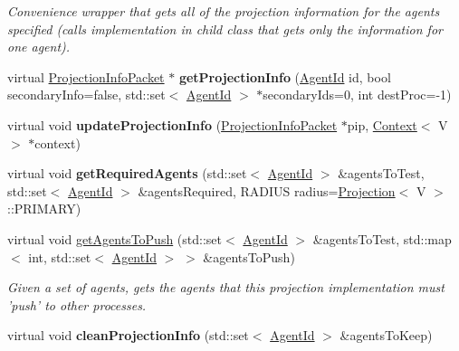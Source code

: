 \begin{DoxyCompactItemize}
\begin{DoxyCompactList}\small\item\em Convenience wrapper that gets all of the projection information for the agents specified (calls implementation in child class that gets only the information for one agent). \end{DoxyCompactList}\item 
\hypertarget{classrepast_1_1_graph_acd792216213093f9fea3b676d10ccdc7}{virtual \hyperlink{classrepast_1_1_projection_info_packet}{Projection\-Info\-Packet} $\ast$ {\bfseries get\-Projection\-Info} (\hyperlink{classrepast_1_1_agent_id}{Agent\-Id} id, bool secondary\-Info=false, std\-::set$<$ \hyperlink{classrepast_1_1_agent_id}{Agent\-Id} $>$ $\ast$secondary\-Ids=0, int dest\-Proc=-\/1)}\label{classrepast_1_1_graph_acd792216213093f9fea3b676d10ccdc7}

\item 
\hypertarget{classrepast_1_1_graph_ad1a011ae319ca66af55a4131e3ce7804}{virtual void {\bfseries update\-Projection\-Info} (\hyperlink{classrepast_1_1_projection_info_packet}{Projection\-Info\-Packet} $\ast$pip, \hyperlink{classrepast_1_1_context}{Context}$<$ V $>$ $\ast$context)}\label{classrepast_1_1_graph_ad1a011ae319ca66af55a4131e3ce7804}

\item 
\hypertarget{classrepast_1_1_graph_af53ecedb239116dfe1a978fdfb1d364c}{virtual void {\bfseries get\-Required\-Agents} (std\-::set$<$ \hyperlink{classrepast_1_1_agent_id}{Agent\-Id} $>$ \&agents\-To\-Test, std\-::set$<$ \hyperlink{classrepast_1_1_agent_id}{Agent\-Id} $>$ \&agents\-Required, R\-A\-D\-I\-U\-S radius=\hyperlink{classrepast_1_1_projection}{Projection}$<$ V $>$\-::P\-R\-I\-M\-A\-R\-Y)}\label{classrepast_1_1_graph_af53ecedb239116dfe1a978fdfb1d364c}

\item 
virtual void \hyperlink{classrepast_1_1_graph_a011c1f0f065e5b8238c6783966c380eb}{get\-Agents\-To\-Push} (std\-::set$<$ \hyperlink{classrepast_1_1_agent_id}{Agent\-Id} $>$ \&agents\-To\-Test, std\-::map$<$ int, std\-::set$<$ \hyperlink{classrepast_1_1_agent_id}{Agent\-Id} $>$ $>$ \&agents\-To\-Push)
\begin{DoxyCompactList}\small\item\em Given a set of agents, gets the agents that this projection implementation must 'push' to other processes. \end{DoxyCompactList}\item 
\hypertarget{classrepast_1_1_graph_a2fa24c44da950218515a28a9ebae26c0}{virtual void {\bfseries clean\-Projection\-Info} (std\-::set$<$ \hyperlink{classrepast_1_1_agent_id}{Agent\-Id} $>$ \&agents\-To\-Keep)}\label{classrepast_1_1_graph_a2fa24c44da950218515a28a9ebae26c0}


\end{DoxyCompactItemize}

